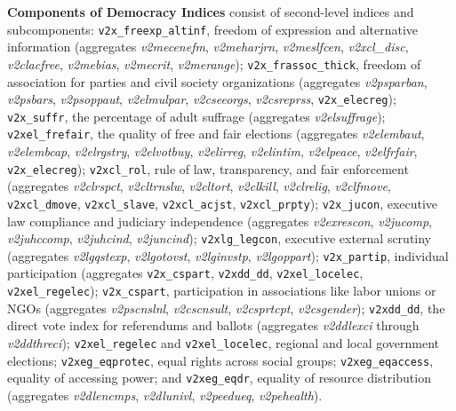 \textbf{Components of Democracy Indices} consist of second-level indices and subcomponents: \texttt{v2x\_freexp\_altinf}, freedom of expression and alternative information (aggregates \textit{v2mecenefm}, \textit{v2meharjrn}, \textit{v2meslfcen}, \textit{v2xcl\_disc}, \textit{v2clacfree}, \textit{v2mebias}, \textit{v2mecrit}, \textit{v2merange}); \texttt{v2x\_frassoc\_thick}, freedom of association for parties and civil society organizations (aggregates \textit{v2psparban}, \textit{v2psbars}, \textit{v2psoppaut}, \textit{v2elmulpar}, \textit{v2cseeorgs}, \textit{v2csreprss}, \texttt{v2x\_elecreg}); \texttt{v2x\_suffr}, the percentage of adult suffrage (aggregates \textit{v2elsuffrage}); \texttt{v2xel\_frefair}, the quality of free and fair elections (aggregates \textit{v2elembaut}, \textit{v2elembcap}, \textit{v2elrgstry}, \textit{v2elvotbuy}, \textit{v2elirreg}, \textit{v2elintim}, \textit{v2elpeace}, \textit{v2elfrfair}, \texttt{v2x\_elecreg}); \texttt{v2xcl\_rol}, rule of law, transparency, and fair enforcement (aggregates \textit{v2clrspct}, \textit{v2cltrnslw}, \textit{v2cltort}, \textit{v2clkill}, \textit{v2clrelig}, \textit{v2clfmove}, \texttt{v2xcl\_dmove}, \texttt{v2xcl\_slave}, \texttt{v2xcl\_acjst}, \texttt{v2xcl\_prpty}); \texttt{v2x\_jucon}, executive law compliance and judiciary independence (aggregates \textit{v2exrescon}, \textit{v2jucomp}, \textit{v2juhccomp}, \textit{v2juhcind}, \textit{v2juncind}); \texttt{v2xlg\_legcon}, executive external scrutiny (aggregates \textit{v2lgqstexp}, \textit{v2lgotovst}, \textit{v2lginvstp}, \textit{v2lgoppart}); \texttt{v2x\_partip}, individual participation (aggregates \texttt{v2x\_cspart}, \texttt{v2xdd\_dd}, \texttt{v2xel\_locelec}, \texttt{v2xel\_regelec}); \texttt{v2x\_cspart}, participation in associations like labor unions or NGOs (aggregates \textit{v2pscnslnl}, \textit{v2cscnsult}, \textit{v2csprtcpt}, \textit{v2csgender}); \texttt{v2xdd\_dd}, the direct vote index for referendums and ballots (aggregates \textit{v2ddlexci} through \textit{v2ddthreci}); \texttt{v2xel\_regelec} and \texttt{v2xel\_locelec}, regional and local government elections; \texttt{v2xeg\_eqprotec}, equal rights across social groups; \texttt{v2xeg\_eqaccess}, equality of accessing power; and \texttt{v2xeg\_eqdr}, equality of resource distribution (aggregates \textit{v2dlencmps}, \textit{v2dlunivl}, \textit{v2peedueq}, \textit{v2pehealth}).



